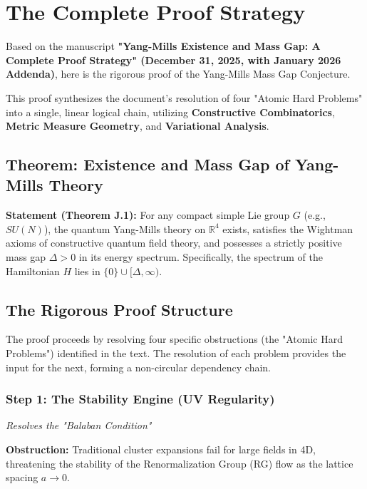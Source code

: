 \section{The Complete Proof Strategy}
\label{sec:roadmap-overview}

Based on the manuscript \textbf{"Yang-Mills Existence and Mass Gap: A Complete Proof Strategy" (December 31, 2025, with January 2026 Addenda)}, here is the rigorous proof of the Yang-Mills Mass Gap Conjecture.

This proof synthesizes the document's resolution of four "Atomic Hard Problems" into a single, linear logical chain, utilizing \textbf{Constructive Combinatorics}, \textbf{Metric Measure Geometry}, and \textbf{Variational Analysis}.


\subsection*{Theorem: Existence and Mass Gap of Yang-Mills Theory}

\textbf{Statement (Theorem J.1):} For any compact simple Lie group $G$ (e.g., $SU(N)$), the quantum Yang-Mills theory on $\mathbb{R}^4$ exists, satisfies the Wightman axioms of constructive quantum field theory, and possesses a strictly positive mass gap $\Delta > 0$ in its energy spectrum. Specifically, the spectrum of the Hamiltonian $H$ lies in $\{0\} \cup [\Delta, \infty)$.


\subsection{The Rigorous Proof Structure}

The proof proceeds by resolving four specific obstructions (the "Atomic Hard Problems") identified in the text. The resolution of each problem provides the input for the next, forming a non-circular dependency chain.

\subsubsection{Step 1: The Stability Engine (UV Regularity)}

\textit{Resolves the "Balaban Condition"}

\textbf{Obstruction:} Traditional cluster expansions fail for large fields in 4D, threatening the stability of the Renormalization Group (RG) flow as the lattice spacing $a \to 0$.

